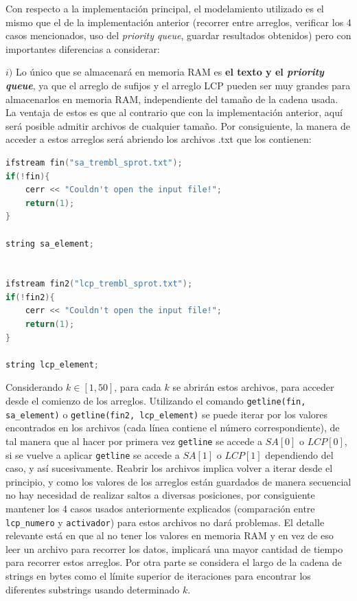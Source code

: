 Con respecto a la implementación principal, el modelamiento utilizado es el mismo que el de la implementación anterior (recorrer entre arreglos, verificar los 4 casos mencionados, uso del \textit{priority queue}, guardar resultados obtenidos) pero con importantes diferencias a considerar:

$i)$ Lo único que se almacenará en memoria RAM es \textbf{el texto y el \textit{priority queue}}, ya que el arreglo de sufijos y el arreglo LCP pueden ser muy grandes para almacenarlos en memoria RAM, independiente del tamaño de la cadena usada. La ventaja de estos es que al contrario que con la implementación anterior, aquí será posible admitir archivos de cualquier tamaño. Por consiguiente, la manera de acceder a estos arreglos será abriendo los archivos .txt que los contienen:

\begin{lstlisting}[language=C++, caption=Activación de archivos que contienen tanto el arreglo de sufijos como el arreglo LCP para un determinado texto.]
ifstream fin("sa_trembl_sprot.txt");
if(!fin){
	cerr << "Couldn't open the input file!";
	return(1);
}

string sa_element;


ifstream fin2("lcp_trembl_sprot.txt");
if(!fin2){
	cerr << "Couldn't open the input file!";
	return(1);
}

string lcp_element;
\end{lstlisting}

Considerando $k \in [1,50]$, para cada $k$ se abrirán estos archivos, para acceder desde el comienzo de los arreglos.
Utilizando el comando \texttt{getline(fin, sa\_element)} o \texttt{getline(fin2, lcp\_element)} se puede iterar por los valores encontrados en los archivos (cada línea contiene el número correspondiente), de tal manera que al hacer por primera vez \texttt{getline} se accede a $SA[0]$ o $LCP[0]$, si se vuelve a aplicar \texttt{getline} se accede a $SA[1]$ o $LCP[1]$ dependiendo del caso, y así sucesivamente. Reabrir los archivos implica volver a iterar desde el principio, y como los valores de los arreglos están guardados de manera secuencial no hay necesidad de realizar saltos a diversas posiciones, por consiguiente mantener los 4 casos usados anteriormente explicados (comparación entre \texttt{lcp\_numero} y \texttt{activador}) para estos archivos no dará problemas. El detalle relevante está en que al no tener los valores en memoria RAM y en vez de eso leer un archivo para recorrer los datos, implicará una mayor cantidad de tiempo para recorrer estos arreglos. Por otra parte se considera el largo de la cadena de strings en bytes como el límite superior de iteraciones para encontrar los diferentes substrings usando determinado $k$.

